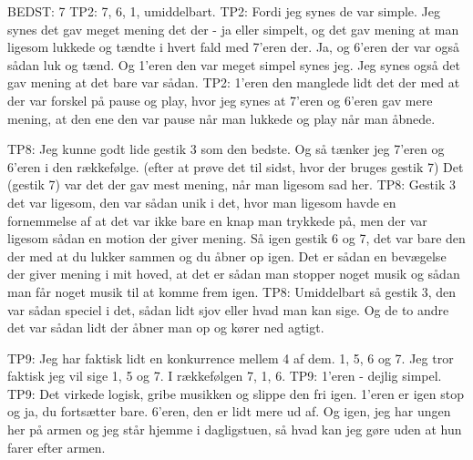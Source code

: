 BEDST: 7
TP2: 7, 6, 1, umiddelbart.
TP2: Fordi jeg synes de var simple. Jeg synes det gav meget mening det der - ja eller simpelt, og det gav mening at man ligesom lukkede og tændte i hvert fald med 7’eren der. Ja, og 6’eren der var også sådan luk og tænd. Og 1’eren den var meget simpel synes jeg. Jeg synes også det gav mening at det bare var sådan.
TP2: 1’eren den manglede lidt det der med at der var forskel på pause og play, hvor jeg synes at 7’eren og 6’eren gav mere mening, at den ene den var pause når man lukkede og play når man åbnede. 



TP8: Jeg kunne godt lide gestik 3 som den bedste. Og så tænker jeg 7’eren og 6’eren i den rækkefølge. (efter at prøve det til sidst, hvor der bruges gestik 7) Det (gestik 7) var det der gav mest mening, når man ligesom sad her. 
TP8: Gestik 3 det var ligesom, den var sådan unik i det, hvor man ligesom havde en fornemmelse af at det var ikke bare en knap man trykkede på, men der var ligesom sådan en motion der giver mening. Så igen gestik 6 og 7, det var bare den der med at du lukker sammen og du åbner op igen. Det er sådan en bevægelse der giver mening i mit hoved, at det er sådan man stopper noget musik og sådan man får noget musik til at komme frem igen. 
TP8: Umiddelbart så gestik 3, den var sådan speciel i det, sådan lidt sjov eller hvad man kan sige. Og de to andre det var sådan lidt der åbner man op og kører ned agtigt. 



TP9: Jeg har faktisk lidt en konkurrence mellem 4 af dem. 1, 5, 6 og 7. Jeg tror faktisk jeg vil sige 1, 5 og 7. I rækkefølgen 7, 1, 6. 
TP9: 1’eren - dejlig simpel. 
TP9: Det virkede logisk, gribe musikken og slippe den fri igen. 1’eren er igen stop og ja, du fortsætter bare. 6’eren, den er lidt mere ud af. Og igen, jeg har ungen her på armen og jeg står hjemme i dagligstuen, så hvad kan jeg gøre uden at hun farer efter armen. 












